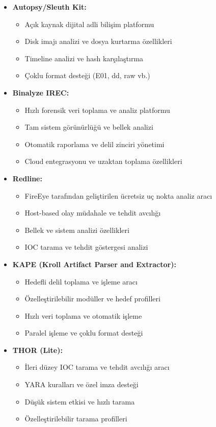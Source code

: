 \begin{itemize}
\begin{itemize}
\begin{itemize}
    \item \textbf{Autopsy/Sleuth Kit:}
    \begin{itemize}
        \item Açık kaynak dijital adli bilişim platformu
        \item Disk imajı analizi ve dosya kurtarma özellikleri
        \item Timeline analizi ve hash karşılaştırma
        \item Çoklu format desteği (E01, dd, raw vb.)
    \end{itemize}

    \item \textbf{Binalyze IREC:}
    \begin{itemize}
        \item Hızlı forensik veri toplama ve analiz platformu
        \item Tam sistem görünürlüğü ve bellek analizi
        \item Otomatik raporlama ve delil zinciri yönetimi
        \item Cloud entegrasyonu ve uzaktan toplama özellikleri
    \end{itemize}

    \item \textbf{Redline:}
    \begin{itemize}
        \item FireEye tarafından geliştirilen ücretsiz uç nokta analiz aracı
        \item Host-based olay müdahale ve tehdit avcılığı
        \item Bellek ve sistem analizi özellikleri
        \item IOC tarama ve tehdit göstergesi analizi
    \end{itemize}

    \item \textbf{KAPE (Kroll Artifact Parser and Extractor):}
    \begin{itemize}
        \item Hedefli delil toplama ve işleme aracı
        \item Özelleştirilebilir modüller ve hedef profilleri
        \item Hızlı veri toplama ve otomatik işleme
        \item Paralel işleme ve çoklu format desteği
    \end{itemize}

    \item \textbf{THOR (Lite):}
    \begin{itemize}
        \item İleri düzey IOC tarama ve tehdit avcılığı aracı
        \item YARA kuralları ve özel imza desteği
        \item Düşük sistem etkisi ve hızlı tarama
        \item Özelleştirilebilir tarama profilleri
    \end{itemize}
\end{itemize}


\end{itemize}
\end{itemize}
